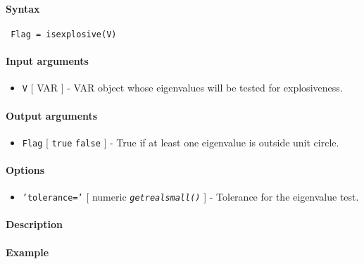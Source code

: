 


	\paragraph{Syntax}
 
 \begin{verbatim}
 Flag = isexplosive(V)
 \end{verbatim}
 
 \paragraph{Input arguments}
 
 \begin{itemize}
 \item
   \texttt{V} {[} VAR {]} - VAR object whose eigenvalues will be tested
   for explosiveness.
 \end{itemize}
 
 \paragraph{Output arguments}
 
 \begin{itemize}
 \item
   \texttt{Flag} {[} \texttt{true} \textbar{} \texttt{false} {]} - True
   if at least one eigenvalue is outside unit circle.
 \end{itemize}
 
 \paragraph{Options}
 
 \begin{itemize}
 \item
   \texttt{'tolerance='} {[} numeric \textbar{}
   \emph{\texttt{getrealsmall()}} {]} - Tolerance for the eigenvalue
   test.
 \end{itemize}
 
 \paragraph{Description}
 
 \paragraph{Example}


